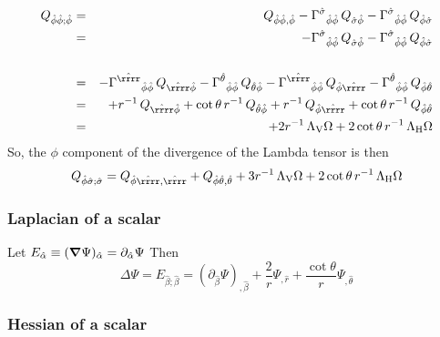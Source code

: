 \documentclass[\mydriver,12pt,twoside,notitlepage,a4paper]{article}
\newcommand{\nab}{\mbox{\boldmath $\nabla$} {}}
\begin{document}
\begin{eqnarray}
Q_{\hat\phi\hat\phi;\hat\phi}
&=&Q_{\hat\phi\hat\phi,\hat\phi}
-{\Gamma^{\hat\sigma}}_{\hat\phi\hat\phi}\,Q_{\hat\sigma\hat\phi}
-{\Gamma^{\hat\sigma}}_{\hat\phi\hat\phi}\,Q_{\hat\phi\hat\sigma}
\cr
&=&
-{\Gamma^{\hat\sigma}}_{\hat\phi\hat\phi}\,Q_{\hat\sigma\hat\phi}
-{\Gamma^{\hat\sigma}}_{\hat\phi\hat\phi}\,Q_{\hat\phi\hat\sigma}
\cr
\cr
&=&
-{\Gamma^{\hat\rrrr}}_{\hat\phi\hat\phi}\,Q_{\hat\rrrr\hat\phi}
-{\Gamma^{\hat\theta}}_{\hat\phi\hat\phi}\,Q_{\hat\theta\hat\phi}
-{\Gamma^{\hat\rrrr}}_{\hat\phi\hat\phi}\,Q_{\hat\phi\hat\rrrr}
-{\Gamma^{\hat\theta}}_{\hat\phi\hat\phi}\,Q_{\hat\phi\hat\theta}
\cr
&=&
+r^{-1}\,Q_{\hat\rrrr\hat\phi}
+\cot\theta\,r^{-1}\,Q_{\hat\theta\hat\phi}
+r^{-1}\,Q_{\hat\phi\hat\rrrr}
+\cot\theta\,r^{-1}\,Q_{\hat\phi\hat\theta}
\cr
&=&
+2r^{-1}\,\Lambda_{\rm V}\Omega
+2\cot\theta\,r^{-1}\,\Lambda_{\rm H}\Omega
\end{eqnarray}
So, the $\phi$ component of the divergence of the Lambda tensor is then
\begin{equation}
Q_{\hat\phi\hat\sigma;\hat\sigma}=
Q_{\hat\phi\hat\rrrr,\hat\rrrr}
+Q_{\hat\phi\hat\theta,\hat\theta}
+3r^{-1}\,\Lambda_{\rm V}\Omega
+2\cot\theta\,r^{-1}\,\Lambda_{\rm H}\Omega
\end{equation}

\subsubsection{Laplacian of a scalar}
Let
$E_{\hat \alpha}\equiv (\nab\Psi)_{\hat\alpha} = \partial_{\hat\alpha}\Psi$
Then
\begin{equation}
\Delta\Psi = E_{\hat\beta;\hat\beta}
= (\partial_{\hat\beta}\Psi)_{,\hat\beta} +
  \frac{2}{r}\Psi_{,\hat r} + \frac{\cot\!\theta}{r}\Psi_{,\hat\theta}
\end{equation}

\subsubsection{Hessian of a scalar}
\end{document}

